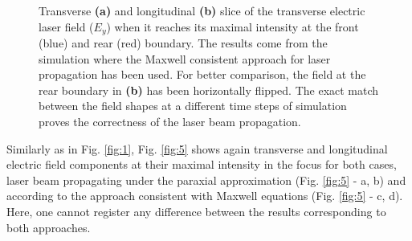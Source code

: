 \begin{figure}[h!]
	\centering
	\hspace{1mm}
	\caption{Transverse \textbf{(a)} and longitudinal \textbf{(b)} slice of the transverse electric laser field ($ E_{y} $) when it reaches its maximal intensity at the front (blue) and rear (red) boundary. The results come from the simulation where the Maxwell consistent approach for laser propagation has been used. For better comparison, the field at the rear boundary in \textbf{(b)} has been horizontally flipped. The exact match between the field shapes at a different time steps of simulation proves the correctness of the laser beam propagation.}
	\label{fig:4}
\end{figure}

Similarly as in Fig. \ref{fig:1}, Fig. \ref{fig:5} shows again transverse and longitudinal electric field components at their maximal intensity in the focus for both cases, laser beam propagating under the paraxial approximation (Fig. \ref{fig:5} - a, b) and according to the approach consistent with Maxwell equations (Fig. \ref{fig:5} - c, d). Here, one cannot register any difference between the results corresponding to both approaches.


